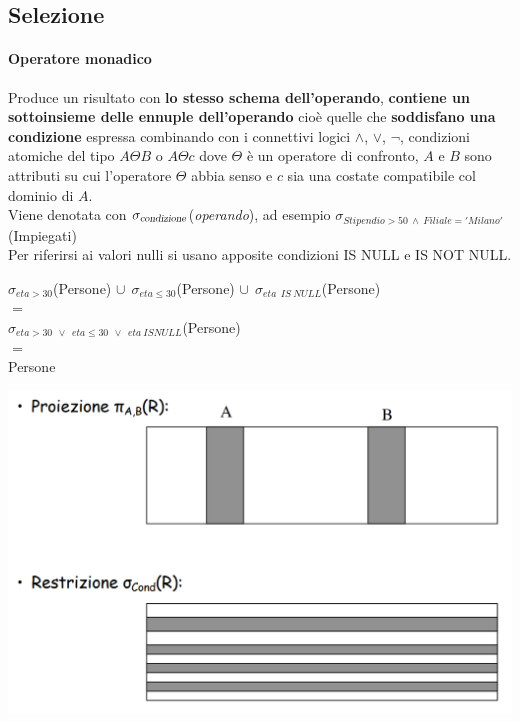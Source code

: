 \documentclass[10pt]{book}
\begin{document}
\subsection{Selezione}
\paragraph{Operatore monadico} Produce un risultato con \textbf{lo stesso schema dell'operando}, \textbf{contiene un sottoinsieme delle ennuple dell'operando} cioè quelle che \textbf{soddisfano una condizione} espressa combinando con i connettivi logici $\wedge$, $\vee$, $\neg$, condizioni atomiche del tipo $A\Theta B$ o $A\Theta c$ dove $\Theta$ è un operatore di confronto, $A$ e $B$ sono attributi su cui l'operatore $\Theta$ abbia senso e $c$ sia una costate compatibile col dominio di $A$.\\
Viene denotata con $\sigma_{\textsl{condizione}}$(\textit{operando}), ad esempio $\sigma_{Stipendio>50\:\wedge\:Filiale='Milano'}$(Impiegati)\\
Per riferirsi ai valori nulli si usano apposite condizioni IS NULL e IS NOT NULL.\\
\begin{center}
$\sigma_{eta>30}$(Persone) $\cup\:\:\sigma_{eta\leq 30}$(Persone) $\cup\:\:\sigma_{eta\:\:IS\:NULL}$(Persone)\\
$=$\\
$\sigma_{eta>30\:\:\vee\:\:eta\leq 30\:\:\vee\:\:eta\:IS NULL}$(Persone)\\
$=$\\
Persone
\end{center}
\begin{center}
	\includegraphics[scale=0.4]{proiezrestriz.png}
\end{center}
\end{document}
